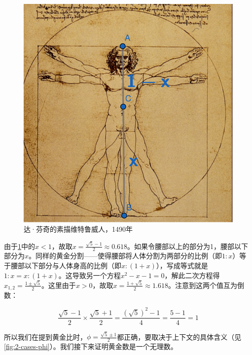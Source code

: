 \documentclass[b5paper]{ctexart}
\begin{document}
\begin{figure}[htbp]
 \centering
 \includegraphics[scale=0.4]{img/gold-ratio}
 \caption{达·芬奇的素描维特鲁威人，1490年}
 \label{fig:gold-ratio}
\end{figure}

由于\cref{fig:gold-ratio}中的$x < 1$，故取$x = \frac{\sqrt{5} - 1}{2} \approx 0.618$。如果令腰部以上的部分为1，腰部以下部分为$x$。同样的黄金分割——使得腰部将人体分割为两部分的比例（即$1 : x$）等于腰部以下部分与人体身高的比例（即$x : (1 + x)$），写成等式就是$1 : x = x : (1 + x)$。这导致另一个方程$x^2 - x - 1 = 0$，解此二次方程得$x_{1, 2} = \frac{1 \pm \sqrt{5}}{2}$。这里由于$x > 0$，故取$x = \frac{1 + \sqrt{5}}{2} \approx 1.618$。注意到这两个值互为倒数：

\[
\frac{\sqrt{5} - 1}{2} \times \frac{\sqrt{5} + 1}{2} = \frac{(\sqrt{5})^2 - 1}{4} = \frac{5 - 1}{4} = 1
\]

所以我们在提到黄金比时，$\phi = \frac{\sqrt{5} \pm 1}{2}$都正确，要取决于上下文的具体含义（见\cref{fig:2-cases-phi}）。我们接下来证明黄金数是一个无理数。
\end{document}

